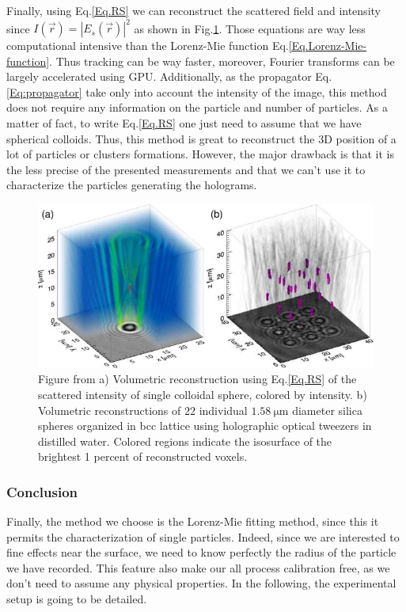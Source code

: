 Finally, using Eq.\ref{Eq.RS} we can reconstruct the scattered field and intensity since $I(\vec{r}) = |E_s(\vec{r})|^2$ as shown in Fig.\ref{fig.sommerfeld}. 
Those equations are way less computational intensive than the Lorenz-Mie function Eq.\ref{Eq.Lorenz-Mie-function}. Thus tracking can be way faster, moreover, Fourier transforms can be largely accelerated using GPU. Additionally, as the propagator Eq.\ref{Eq:propagator} take only into account the intensity of the image, this method does not require any information on the particle and number of particles. As a matter of fact,   to write Eq.\ref{Eq.RS} one just need to assume that we have spherical colloids. Thus, this method is great to reconstruct the 3D position of a lot of particles or clusters formations. However, the major drawback is that it is the less precise of the presented measurements and that we can't use it to characterize the particles generating the holograms.

\begin{figure}[h!]
	\centering
	\includegraphics[scale=2]{02_body/chapter2/images/sommerfel_demo.jpg}
	\caption{Figure from \cite{cheong_strategies_2010} a) Volumetric reconstruction using Eq.\ref{Eq.RS} of the scattered intensity of single colloidal sphere, colored by intensity. b) Volumetric reconstructions of $22$ individual $1.58 ~ \mathrm{\mu m}$ diameter silica spheres organized in bcc lattice using holographic optical tweezers in distilled water. Colored regions indicate the isosurface of the brightest 1 percent of reconstructed voxels.}
	\label{fig.sommerfeld}
\end{figure}



\subsubsection{Conclusion}

Finally, the method we choose is the Lorenz-Mie fitting method, since this it permits the characterization of single particles. Indeed, since we are interested to fine effects near the surface, we need to know perfectly the radius of the particle we have recorded. This feature also make our all process calibration free, as we don't need to assume any physical properties. In the following, the experimental setup is going to be detailed.


